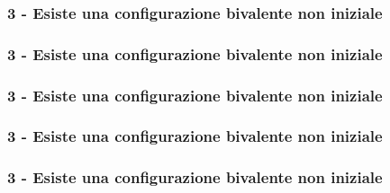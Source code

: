 \documentclass{beamer}
\begin{document}
\begin{frame}\frametitle{3 - Esiste una configurazione bivalente non iniziale}
\begin{center}\color{black}{Configurazioni vicine raggiungono configurazioni discordi}\end{center}
\begin{figure}\centering\end{figure}
\end{frame}

\begin{frame}\frametitle{3 - Esiste una configurazione bivalente non iniziale}
\begin{center}\color{black}{$e=(p,m)$ ed $e'=(p',m')$}\end{center}
\begin{figure}\centering\end{figure}
\begin{center}\color{white}{assurdo se $p=p'$}\end{center}
\end{frame}

\begin{frame}\frametitle{3 - Esiste una configurazione bivalente non iniziale}
\begin{center}\color{black}{$e=(p,m)$ ed $e'=(p',m')$}\end{center}
\begin{figure}\centering\end{figure}
\begin{center}\color{black}{assurdo se $p\neq p'$}\end{center}
\end{frame}

\begin{frame}\frametitle{3 - Esiste una configurazione bivalente non iniziale}
\begin{center}\color{black}{$e=(p,m)$ ed $e'=(p,m')$}\end{center}
\begin{figure}\centering\end{figure}
\begin{center}\color{white}{assurdo se $p=p'$}\end{center}
\end{frame}

\begin{frame}\frametitle{3 - Esiste una configurazione bivalente non iniziale}
\begin{center}\color{black}{$e=(p,m)$ ed $e'=(p,m')$}\end{center}
\begin{figure}\centering\end{figure}
\begin{center}\color{white}{assurdo se $p=p'$}\end{center}
\end{frame}
\end{document}
